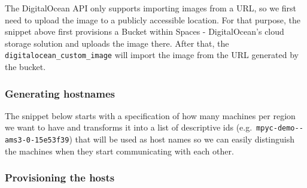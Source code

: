 The DigitalOcean API only supports importing images from a URL, so we
first need to upload the image to a publicly accessible location. For
that purpose, the snippet above first provisions a Bucket within Spaces
- DigitalOcean's cloud storage solution and uploads the image there.
After that, the \texttt{digitalocean\_custom\_image} will import the
image from the URL generated by the bucket.

\hypertarget{generating-hostnames}{%
\subsubsection{Generating hostnames}\label{generating-hostnames}}

The snippet below starts with a specification of how many machines per
region we want to have and transforms it into a list of descriptive ids
(e.g.~\texttt{mpyc-demo-\/-ams3-0-15e53f39}) that will be used as host
names so we can easily distinguish the machines when they start
communicating with each other.

\begin{Shaded}
\begin{Highlighting}[]
\NormalTok{  node\_definitions = var.DESTROY\_NODES != "" ? [}
\NormalTok{    ] : [}
\NormalTok{  ]}

\NormalTok{  nodes\_expanded = flatten([}
\NormalTok{    for node in local.node\_definitions : [}
\NormalTok{      \})}
\NormalTok{    ]}
\NormalTok{  ])}

\NormalTok{    \})}
\NormalTok{  \}}
\NormalTok{\}}
\end{Highlighting}
\end{Shaded}

\hypertarget{provisioning-the-hosts}{%
\subsubsection{Provisioning the hosts}\label{provisioning-the-hosts}}

